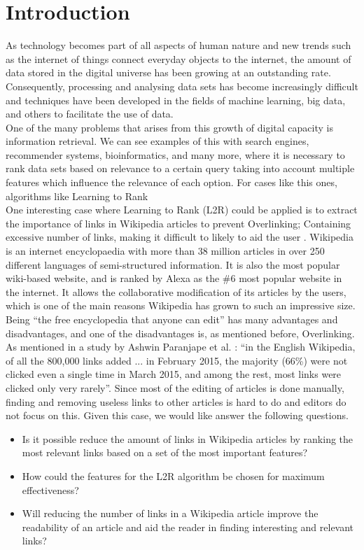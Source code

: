 \section{Introduction}

As technology becomes part of all aspects of human nature and new trends such as the internet of things connect everyday objects to the internet, the amount of data stored in the digital universe has been growing at an outstanding rate. Consequently, processing and analysing data sets has become increasingly difficult and techniques have been developed in the fields of machine learning, big data, and others to facilitate the use of data. \\
One of the many problems that arises from this growth of digital capacity is information retrieval. We can see examples of this with search engines, recommender systems, bioinformatics, and many more, where it is necessary to rank data sets based on relevance to a certain query taking into account multiple features which influence the relevance of each option. For cases like this ones, algorithms like Learning to Rank \\
One interesting case where Learning to Rank (L2R) could be applied is to extract the importance of links in Wikipedia articles to prevent Overlinking; Containing excessive number of links, making it difficult to likely to aid the user \cite{missing_links}. Wikipedia is an internet encyclopaedia with more than 38 million articles in over 250 different languages of semi-structured information. It is also the most popular wiki-based website, and is ranked by Alexa as the \#6 most popular website in the internet. It allows the collaborative modification of its articles by the users, which is one of the main reasons Wikipedia has grown to such an impressive size. \\
Being ``the free encyclopedia that anyone can edit'' has many advantages and disadvantages, and one of the disadvantages is, as mentioned before, Overlinking. As mentioned in a study by Ashwin Paranjape et al. \cite{paranjape}:  ``in the English Wikipedia, of all the 800,000 links added ... in February 2015, the majority (66\%) were not clicked even a single time in March 2015, and among the rest, most links were clicked only very rarely''. Since most of the editing of articles is done manually, finding and removing useless links to other articles is hard to do and editors do not focus on this. Given this case, we would like answer the following questions.

\begin{itemize}
\item Is it possible reduce the amount of links in Wikipedia articles by ranking the most relevant links based on a set of the most important features?
\item How could the features for the L2R algorithm be chosen for maximum effectiveness?
\item Will reducing the number of links in a Wikipedia article improve the readability of an article and aid the reader in finding interesting and relevant links?
\end{itemize}
